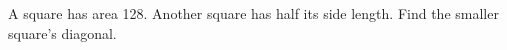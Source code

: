 A square has area 128. Another square has half its side length. Find the smaller square's diagonal.

